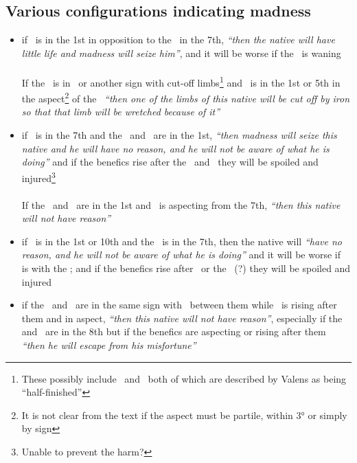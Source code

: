 \subsection{Various configurations indicating madness}
\begin{itemize}[topsep=0em,itemsep=0em]
\item[\Mars]  if \Mars\, is in the 1st in opposition to the \Moon\, in the 7th, \textsl{``then the native will have little life and madness will seize him''}, and it will be worse if the \Moon\, is waning \\ \\
If the \Moon\, is in \Taurus\, or another sign with cut-off limbs\footnote{These possibly include \Capricorn\, and \Sagittarius\, both of which are described by Valens as being ``half-finished''} and \Mars\, is in the 1st or 5th in the aspect\footnote{It is not clear from the text if the aspect must be partile, within 3° or simply by sign} of the \Moon\, \textsl{``then one of the limbs of this native will be cut off by iron so that that limb will be wretched because of it''}

\item[\Jupiter]  if \Jupiter\, is in the 7th and the \Moon\, and \Mars\, are in the 1st, \textsl{``then madness will seize this native and he will have no reason, and he will not be aware of what he is doing''} and if the benefics rise after the \Moon\, and \Mars\, they will be spoiled and injured\footnote{Unable to prevent the harm?} \\ \\

If  the \Moon\, and \Jupiter\, are in the 1st and \Mars\, is aspecting from the 7th, \textsl{``then this native will not have reason''}

\item[\Saturn]  if \Saturn\, is in the 1st or 10th and the \Moon\, is in the 7th, then the native will \textsl{``have no reason, and he will not be aware of what he is doing''} and it will be worse if \Mars\, is with the \Moon; and if the benefics rise after \Saturn\, or the \Moon\, (?) they will be spoiled and injured

\item[\Sun]  if the \Sun\, and \Moon\, are in the same sign with \Mars\, between them while \Saturn\, is rising after them and in aspect, \textsl{``then this native will not have reason''}, especially if the \Sun\, and \Moon\, are in the 8th but if the benefics are aspecting or rising after them \textsl{``then he will escape from his misfortune''}
\end{itemize}

